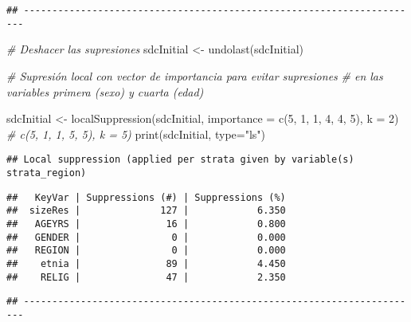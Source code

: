 \documentclass[
]{book}
\newenvironment{Shaded}{\begin{snugshade}}{\end{snugshade}}
\newcommand{\AttributeTok}[1]{\textcolor[rgb]{0.77,0.63,0.00}{#1}}
\newcommand{\CommentTok}[1]{\textcolor[rgb]{0.56,0.35,0.01}{\textit{#1}}}
\newcommand{\DecValTok}[1]{\textcolor[rgb]{0.00,0.00,0.81}{#1}}
\newcommand{\FunctionTok}[1]{\textcolor[rgb]{0.00,0.00,0.00}{#1}}
\newcommand{\NormalTok}[1]{#1}
\newcommand{\OtherTok}[1]{\textcolor[rgb]{0.56,0.35,0.01}{#1}}
\newcommand{\StringTok}[1]{\textcolor[rgb]{0.31,0.60,0.02}{#1}}
\theoremstyle{definition}
\theoremstyle{definition}
\theoremstyle{definition}
\theoremstyle{definition}
\theoremstyle{remark}
\begin{document}
\begin{verbatim}
## ----------------------------------------------------------------------
\end{verbatim}

\begin{Shaded}
\begin{Highlighting}[]
\CommentTok{\# Deshacer las supresiones}
\NormalTok{sdcInitial }\OtherTok{\textless{}{-}} \FunctionTok{undolast}\NormalTok{(sdcInitial)}

\CommentTok{\# Supresión local con vector de importancia para evitar supresiones}
\CommentTok{\# en las variables primera (sexo) y cuarta (edad)}

\NormalTok{sdcInitial }\OtherTok{\textless{}{-}} \FunctionTok{localSuppression}\NormalTok{(sdcInitial, }\AttributeTok{importance =} \FunctionTok{c}\NormalTok{(}\DecValTok{5}\NormalTok{, }\DecValTok{1}\NormalTok{, }\DecValTok{1}\NormalTok{, }\DecValTok{4}\NormalTok{, }\DecValTok{4}\NormalTok{, }\DecValTok{5}\NormalTok{), }\AttributeTok{k =} \DecValTok{2}\NormalTok{) }\CommentTok{\#  c(5, 1, 1, 5, 5), k = 5)}
\FunctionTok{print}\NormalTok{(sdcInitial, }\AttributeTok{type=}\StringTok{"ls"}\NormalTok{)}
\end{Highlighting}
\end{Shaded}

\begin{verbatim}
## Local suppression (applied per strata given by variable(s) strata_region)
\end{verbatim}

\begin{verbatim}
##   KeyVar | Suppressions (#) | Suppressions (%)
##  sizeRes |              127 |            6.350
##   AGEYRS |               16 |            0.800
##   GENDER |                0 |            0.000
##   REGION |                0 |            0.000
##    etnia |               89 |            4.450
##    RELIG |               47 |            2.350
\end{verbatim}

\begin{verbatim}
## ----------------------------------------------------------------------
\end{verbatim}
\end{document}
